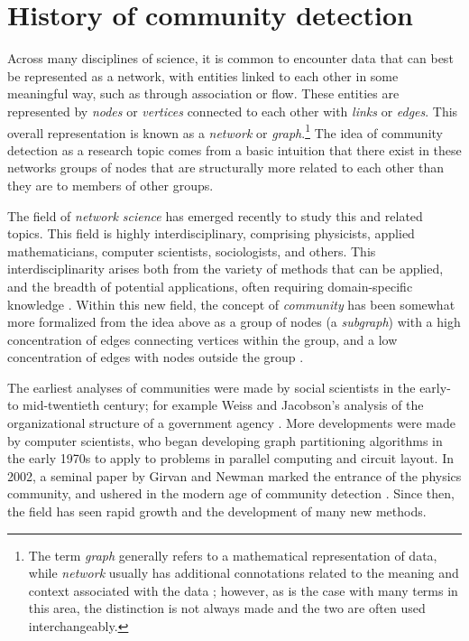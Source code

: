 \section{History of community
detection}\label{history-of-community-detection}

Across many disciplines of science, it is common to encounter data that
can best be represented as a network, with entities linked to each other
in some meaningful way, such as through association or flow. These
entities are represented by \emph{nodes} or \emph{vertices} connected to
each other with \emph{links} or \emph{edges}. This overall
representation is known as a \emph{network} or \emph{graph}.\footnote{The
  term \emph{graph} generally refers to a mathematical representation of
  data, while \emph{network} usually has additional connotations related
  to the meaning and context associated with the data
  \autocite{porter_communities_2009}; however, as is the case with many
  terms in this area, the distinction is not always made and the two are
  often used interchangeably.} The idea of community detection as a
research topic comes from a basic intuition that there exist in these
networks groups of nodes that are structurally more related to each
other than they are to members of other groups.

The field of \emph{network science} has emerged recently to study this
and related topics. This field is highly interdisciplinary, comprising
physicists, applied mathematicians, computer scientists, sociologists,
and others. This interdisciplinarity arises both from the variety of
methods that can be applied, and the breadth of potential applications,
often requiring domain-specific knowledge
\autocite{porter_communities_2009}. Within this new field, the concept
of \emph{community} has been somewhat more formalized from the idea
above as a group of nodes (a \emph{subgraph}) with a high concentration
of edges connecting vertices within the group, and a low concentration
of edges with nodes outside the group
\autocite{fortunato_community_2010}.

The earliest analyses of communities were made by social scientists in
the early- to mid-twentieth century; for example Weiss and Jacobson's
analysis of the organizational structure of a government agency
\autocite{weiss_method_1955}. More developments were made by computer
scientists, who began developing graph partitioning algorithms in the
early 1970s to apply to problems in parallel computing and circuit
layout. In 2002, a seminal paper by Girvan and Newman
\autocite{girvan_community_2002} marked the entrance of the physics
community, and ushered in the modern age of community detection
\autocite{lancichinetti_community_2009}. Since then, the field has seen
rapid growth and the development of many new methods.

